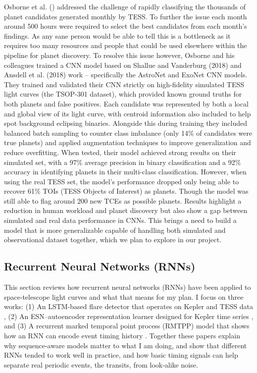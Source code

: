 \documentclass[letterpaper]{article} %
\begin{document}
Osborne et al. (\citeyear{Osborn2019rapidclassificationtesscandidates}) addressed the challenge of rapidly classifying the thousands of planet candidates generated monthly by TESS. To further the issue each month around 500 hours were required to select the best candidates from each month's findings. As any sane person would be able to tell this is a bottleneck as it requires too many resources and people that could be used elsewhere within the pipeline for planet discovery. To resolve this issue however, Osborne and his colleagues trained a CNN model based on Shallue and Vanderburg (2018) and Ansdell et al. (2018) work – specifically the AstroNet and ExoNet CNN models. They trained and validated their CNN strictly on high-fidelity simulated TESS light curves (the TSOP-301 dataset), which provided known ground truths for both planets and false positives. Each candidate was represented by both a local and global view of its light curve, with centroid information also included to help spot background eclipsing binaries. Alongside this during training they included balanced batch sampling to counter class imbalance (only 14\% of candidates were true planets) and applied augmentation techniques to improve generalization and reduce overfitting. When tested, their model achieved strong results on their simulated set, with a 97\% average precision in binary classification and a 92\% accuracy in identifying planets in their multi-class classification. However, when using the real TESS set, the model’s performance dropped only being able to recover 61\% TOIs (TESS Objects of Interest) as planets. Though the model was still able to flag around 200 new TCEs as possible planets. Results highlight a reduction in human workload and planet discovery but also show a gap between simulated and real data performance in CNNs. This brings a need to build a model that is more generalizable capable of handling both simulated and observational dataset together, which we plan to explore in our project.

\subsection{Recurrent Neural Networks (RNNs)}
This section reviews how recurrent neural networks (RNNs) have been applied to space-telescope light curves and what that means for my plan. I focus on three works: (1) An LSTM-based flare detector that operates on Kepler and TESS data \cite{Vida2021findingflaresrecurrent}, (2) An ESN–autoencoder representation learner designed for Kepler time series \cite{kugler2016explorativeapproachkepler}, and (3) A recurrent marked temporal point process (RMTPP) model that shows how an RNN can encode event timing history \cite{Du2016markedtemporalpoint}. Together these papers explain why sequence-aware models matter to what I am doing, and show that different RNNs tended to work well in practice, and how basic timing signals can help separate real periodic events, the transits, from look‑alike noise.
\end{document}
